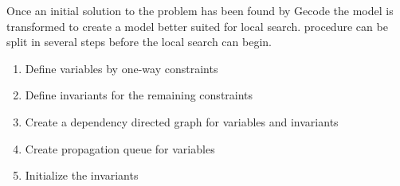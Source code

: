 Once an initial solution to the problem has been found by Gecode the model is transformed to create a model better 
suited for local search.  procedure can 
be split in several steps before the local search can begin. 
\begin{enumerate}
 \item Define variables by one-way constraints
 \item Define invariants for the remaining constraints
 \item Create a dependency directed graph for variables and invariants
 \item Create propagation queue for variables
 \item Initialize the invariants
\end{enumerate}